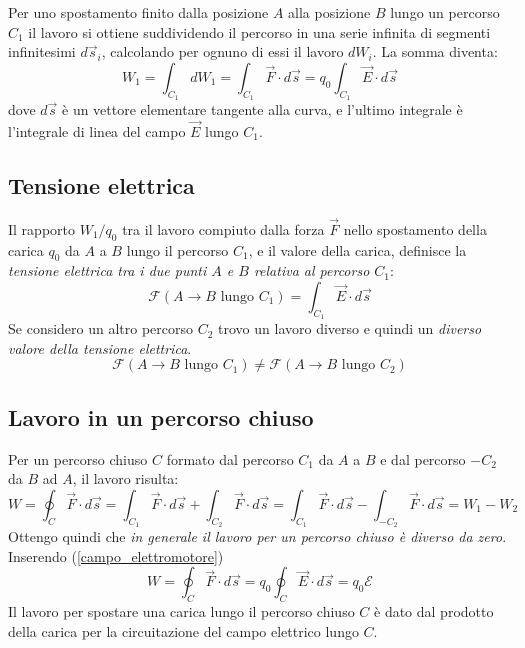 \documentclass[class=book, crop=false, oneside, 12pt]{standalone}
\begin{document}
Per uno spostamento finito dalla posizione \(A\) alla posizione \(B\) lungo un percorso \(C_1\) il lavoro si ottiene suddividendo il percorso in una serie infinita di segmenti infinitesimi \(d \overrightarrow{s}_i\), calcolando per ognuno di essi il lavoro \(dW_i\).
La somma diventa:
\begin{equation} \label{lavoro_elettrostatico}
    W_1 = \int_{C_1} d W_1 = \int_{C_1} \overrightarrow{F} \cdot d \overrightarrow{s} = q_0 \int_{C_1} \overrightarrow{E} \cdot d \overrightarrow{s}
\end{equation}
dove \(d \overrightarrow{s}\) è un vettore elementare tangente alla curva, e l'ultimo integrale è l'integrale di linea del campo \(\overrightarrow{E}\) lungo \(C_1\).

\subsection{Tensione elettrica}

Il rapporto \(W_1 / q_0\) tra il lavoro compiuto dalla forza \(\overrightarrow{F}\) nello spostamento della carica \(q_0\) da \(A\) a \(B\) lungo il percorso \(C_1\), e il valore della carica, definisce la \emph{tensione elettrica tra i due punti \(A\) e \(B\) relativa al percorso \(C_1\)}:
\begin{equation}
    \mathcal{F} \left(A \rightarrow B \text{ lungo } C_1\right) = \int_{C_1} \overrightarrow{E} \cdot d \overrightarrow{s}
\end{equation}
Se considero un altro percorso \(C_2\) trovo un lavoro diverso e quindi un \emph{diverso valore della tensione elettrica}.
\begin{equation*}
    \mathcal{F} \left(A \rightarrow B \text{ lungo } C_1\right) \neq \mathcal{F} \left(A \rightarrow B \text{ lungo } C_2\right)
\end{equation*}

\subsection{Lavoro in un percorso chiuso}

Per un percorso chiuso \(C\) formato dal percorso \(C_1\) da \(A\) a \(B\) e dal percorso \(-C_2\) da \(B\) ad \(A\), il lavoro risulta:
\begin{equation*}
    W = \oint_{C} \overrightarrow{F} \cdot d \overrightarrow{s} = \int_{C_1} \overrightarrow{F} \cdot d \overrightarrow{s} + \int_{C_2} \overrightarrow{F} \cdot d \overrightarrow{s} = \int_{C_1} \overrightarrow{F} \cdot d \overrightarrow{s} - \int_{-C_2} \overrightarrow{F} \cdot d \overrightarrow{s} = W_1 - W_2
\end{equation*}
Ottengo quindi che \emph{in generale il lavoro per un percorso chiuso è diverso da zero}. Inserendo (\ref{campo_elettromotore})
\begin{equation}
    W = \oint_{C} \overrightarrow{F} \cdot d \overrightarrow{s} = q_0 \oint_{C} \overrightarrow{E} \cdot d \overrightarrow{s} = q_0 \mathcal{E}
\end{equation}
Il lavoro per spostare una carica lungo il percorso chiuso \(C\) è dato dal prodotto della carica per la circuitazione del campo elettrico lungo \(C\).
\end{document}
